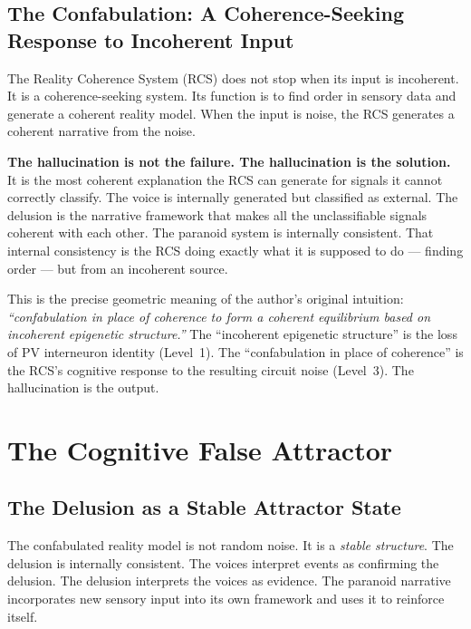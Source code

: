 \documentclass[12pt,a4paper]{article}
\newenvironment{warnenv}{%
  \begin{tcolorbox}[colback=red!5,colframe=warnbox,boxrule=1pt,
    arc=3pt,left=8pt,right=8pt,top=6pt,bottom=6pt,breakable]}{%
  \end{tcolorbox}}
\begin{document}
\subsection{The Confabulation: A Coherence-Seeking
Response to Incoherent Input}

The Reality Coherence System (RCS) does not stop when its
input is incoherent. It is a coherence-seeking system. Its
function is to find order in sensory data and generate a
coherent reality model. When the input is noise, the RCS
generates a coherent narrative from the noise.

\begin{warnenv}
\textbf{The hallucination is not the failure.
The hallucination is the solution.}\\[4pt]
It is the most coherent explanation the RCS can generate for
signals it cannot correctly classify. The voice is internally
generated but classified as external. The delusion is the
narrative framework that makes all the unclassifiable signals
coherent with each other. The paranoid system is internally
consistent. That internal consistency is the RCS doing
exactly what it is supposed to do --- finding order ---
but from an incoherent source.
\end{warnenv}

This is the precise geometric meaning of the author's original
intuition: \textit{``confabulation in place of coherence to
form a coherent equilibrium based on incoherent epigenetic
structure.''} The ``incoherent epigenetic structure'' is the
loss of PV interneuron identity (Level~1). The ``confabulation
in place of coherence'' is the RCS's cognitive response
to the resulting circuit noise (Level~3). The hallucination
is the output.

\section{The Cognitive False Attractor}

\subsection{The Delusion as a Stable Attractor State}

The confabulated reality model is not random noise. It is a
\emph{stable structure}. The delusion is internally consistent.
The voices interpret events as confirming the delusion. The
delusion interprets the voices as evidence. The paranoid
narrative incorporates new sensory input into its own
framework and uses it to reinforce itself.
\end{document}
